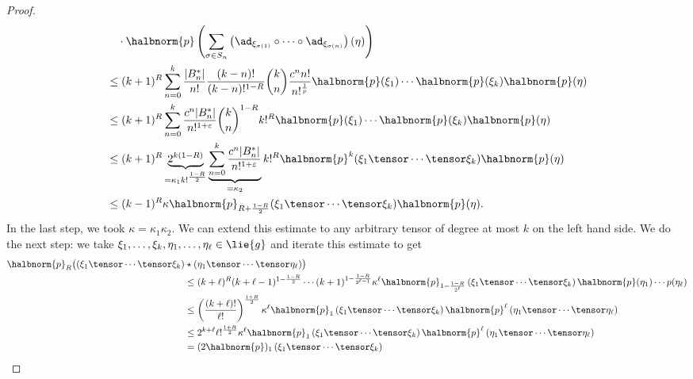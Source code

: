 \documentclass[
11pt,                          %
english                        %
]{article}
\begin{document}
\begin{proof}
\begin{align*}
		& \quad \cdot
		\halbnorm{p} \left(
			\sum	\limits_{\sigma \in S_n}
			\left( 
				\ad_{\xi_{\sigma(1)}} 
				\circ \cdots \circ
				\ad_{\xi_{\sigma(n)}}
			\right)
			(\eta)
		\right)
		\\
		& \leq
		(k + 1)^R
		\sum\limits_{n = 0}^k
		\frac{|B_n^*|}{n!}
		\frac{(k-n)!}{(k-n)!^{1 - R}}
		\binom{k}{n}
		\frac{c^n n!}{n!^{\frac{1}{p}}}
		\halbnorm{p}(\xi_1) \cdots \halbnorm{p}(\xi_k)
		\halbnorm{p}(\eta)
		\\
		& \leq
		(k + 1)^R
		\sum\limits_{n = 0}^k
		\frac{c^n |B_n^*|}{n!^{1 + \varepsilon}}
		\binom{k}{n}^{1-R}
		k!^R
		\halbnorm{p}(\xi_1) \cdots \halbnorm{p}(\xi_k) 
		\halbnorm{p}(\eta)
		\\
		& \leq
		(k + 1)^R
		\underbrace{
			2^{k (1-R)}
		}_{
			=\kappa_1 k!^{\frac{1-R}{2}}
		}
		\underbrace{
			\sum\limits_{n = 0}^k
			\frac{c^n |B_n^*|}{n!^{1 + \varepsilon}}
		}_{
			= \kappa_2
		}
		k!^R
		\halbnorm{p}^k(\xi_1 \tensor \cdots \tensor \xi_k) 
		\halbnorm{p}(\eta)
		\\
		& \leq
		(k-1)^R
		\kappa
		\halbnorm{p}_{R + \frac{1-R}{2}}
		(\xi_1 \tensor \cdots \tensor \xi_k)
		\halbnorm{p}(\eta).
	\end{align*}
	In the last step, we took $\kappa = \kappa_1 \kappa_2$. We can extend this 
	estimate to any arbitrary tensor of degree at most $k$ on the left hand side.
	We do the next step: we take $\xi_1, \ldots, \xi_k, \eta_1, \ldots, 
	\eta_\ell \in \lie{g}$ and iterate this estimate to get
	\begin{align*}
		\halbnorm{p}_R \big(
			(\xi_1 \tensor \cdots \tensor \xi_k)
		&
			\star
			(\eta_1 \tensor \cdots \tensor \eta_\ell)
		\big)
		\\
		& \leq
		(k + \ell)^R (k + \ell - 1)^{1 - \frac{1 - R}{2}}
		\cdots (k+1)^{{1 - \frac{1 - R}{2^{\ell - 1}}}}
		\kappa^\ell
		\halbnorm{p}_{1 - \frac{1-R}{2^\ell}}
		\left( \xi_1 \tensor \cdots \tensor \xi_k \right)
		\halbnorm{p}(\eta_1) \cdots p(\eta_\ell)
		\\
		& \leq
		\left( \frac{(k+\ell)!}{\ell!} \right)^{\frac{1 + R}{2}}
		\kappa^\ell
		\halbnorm{p}_1 \left( \xi_1 \tensor \cdots \tensor \xi_k \right)
		\halbnorm{p}^\ell \left( \eta_1 \tensor \cdots \tensor \eta_\ell \right)
		\\
		& \leq
		2^{k + \ell}
		\ell!^{\frac{1 + R}{2}}
		\kappa^\ell
		\halbnorm{p}_1 \left( \xi_1 \tensor \cdots \tensor \xi_k \right)
		\halbnorm{p}^\ell \left( \eta_1 \tensor \cdots \tensor \eta_\ell \right)
		\\
		&=
		(2 \halbnorm{p})_1 \left( \xi_1 \tensor \cdots \tensor \xi_k \right)

\end{align*}
\end{proof}
\end{document}
